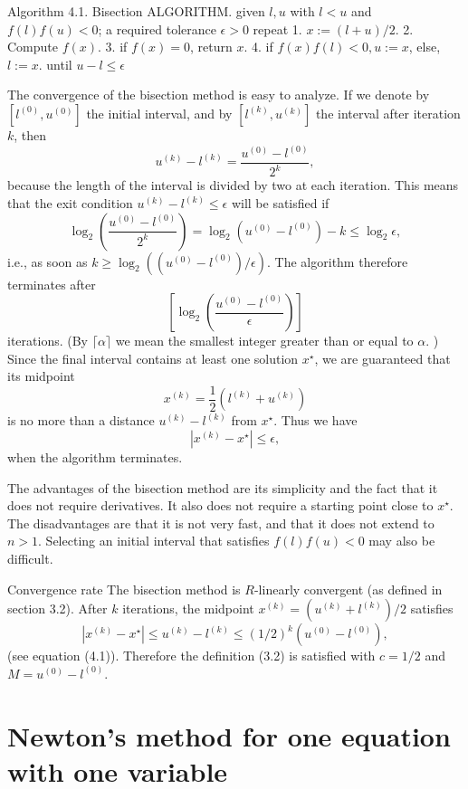 \begin{algorithm}
    Algorithm 4.1. Bisection ALGORITHM.
given $ l, u $ with $ l<u $ and $ f(l) f(u)<0 $; a required tolerance $ \epsilon>0 $ repeat
1. $ x:=(l+u) / 2 $.
2. Compute $ f(x) $.
3. if $ f(x)=0 $, return $ x $.
4. if $ f(x) f(l)<0, u:=x $, else, $ l:=x $.
until $ u-l \leq \epsilon $
\end{algorithm}

The convergence of the bisection method is easy to analyze. If we denote by $ \left[l^{(0)}, u^{(0)}\right] $ the initial interval, and by $ \left[l^{(k)}, u^{(k)}\right] $ the interval after iteration $ k $, then
$$
u^{(k)}-l^{(k)}=\frac{u^{(0)}-l^{(0)}}{2^{k}},
$$
because the length of the interval is divided by two at each iteration. This means that the exit condition $ u^{(k)}-l^{(k)} \leq \epsilon $ will be satisfied if
$$
\log _{2}\left(\frac{u^{(0)}-l^{(0)}}{2^{k}}\right)=\log _{2}\left(u^{(0)}-l^{(0)}\right)-k \leq \log _{2} \epsilon,
$$
i.e., as soon as $ k \geq \log _{2}\left(\left(u^{(0)}-l^{(0)}\right) / \epsilon\right) $. The algorithm therefore terminates after
$$
\left[\log _{2}\left(\frac{u^{(0)}-l^{(0)}}{\epsilon}\right)\right]
$$
iterations. (By $ \lceil\alpha\rceil $ we mean the smallest integer greater than or equal to $ \alpha . $ )
Since the final interval contains at least one solution $ x^{\star} $, we are guaranteed that its midpoint
$$
x^{(k)}=\frac{1}{2}\left(l^{(k)}+u^{(k)}\right)
$$
is no more than a distance $ u^{(k)}-l^{(k)} $ from $ x^{\star} $. Thus we have
$$
\left|x^{(k)}-x^{\star}\right| \leq \epsilon,
$$
when the algorithm terminates.

The advantages of the bisection method are its simplicity and the fact that it does not require derivatives. It also does not require a starting point close to $ x^{\star} $. The disadvantages are that it is not very fast, and that it does not extend to $ n>1 $. Selecting an initial interval that satisfies $ f(l) f(u)<0 $ may also be difficult.

Convergence rate The bisection method is $ R $-linearly convergent (as defined in section 3.2). After $ k $ iterations, the midpoint $ x^{(k)}=\left(u^{(k)}+l^{(k)}\right) / 2 $ satisfies
$$
\left|x^{(k)}-x^{\star}\right| \leq u^{(k)}-l^{(k)} \leq(1 / 2)^{k}\left(u^{(0)}-l^{(0)}\right),
$$
(see equation (4.1)). Therefore the definition (3.2) is satisfied with $ c=1 / 2 $ and $ M=u^{(0)}-l^{(0)} $.

\section{Newton’s method for one equation with one variable}


